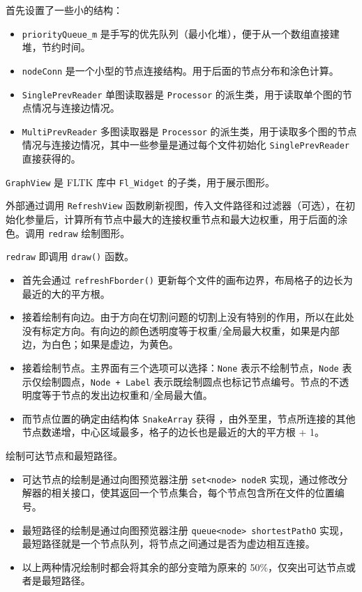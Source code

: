 \documentclass[a4paper,12pt]{article}
\begin{document}
\begin{CJK}{UTF8}{song}
首先设置了一些小的结构：

\begin{itemize}
\item
  \texttt{priorityQueue\_m}
  是手写的优先队列（最小化堆），便于从一个数组直接建堆，节约时间。
\item
  \texttt{nodeConn}
  是一个小型的节点连接结构。用于后面的节点分布和涂色计算。
\item
  \texttt{SinglePrevReader} 单图读取器是 \texttt{Processor}
  的派生类，用于读取单个图的节点情况与连接边情况。
\item
  \texttt{MultiPrevReader} 多图读取器是 \texttt{Processor}
  的派生类，用于读取多个图的节点情况与连接边情况，其中一些参量是通过每个文件初始化
  \texttt{SinglePrevReader} 直接获得的。
\end{itemize}

\texttt{GraphView} 是 FLTK 库中 \texttt{Fl\_Widget}
的子类，用于展示图形。

外部通过调用 \texttt{RefreshView}
函数刷新视图，传入文件路径和过滤器（可选），在初始化参量后，计算所有节点中最大的连接权重节点和最大边权重，用于后面的涂色。调用
\texttt{redraw} 绘制图形。

\texttt{redraw} 即调用 \texttt{draw()} 函数。

\begin{itemize}
\item
  首先会通过 \texttt{refreshFborder()}
  更新每个文件的画布边界，布局格子的边长为最近的大的平方根。
\item
  接着绘制有向边。由于方向在切割问题的切割上没有特别的作用，所以在此处没有标定方向。有向边的颜色透明度等于权重/全局最大权重，如果是内部边，为白色；如果是虚边，为黄色。
\item
  接着绘制节点。主界面有三个选项可以选择：\texttt{None}
  表示不绘制节点，\texttt{Node} 表示仅绘制圆点，\texttt{Node\ +\ Label}
  表示既绘制圆点也标记节点编号。节点的不透明度等于节点的发出边权重和/全局最大值。
\item
  而节点位置的确定由结构体 \texttt{SnakeArray} 获得
  \cite{oj}，由外至里，节点所连接的其他节点数递增，中心区域最多，格子的边长也是最近的大的平方根
  + 1。
\end{itemize}

绘制可达节点和最短路径。

\begin{itemize}
  \item 可达节点的绘制是通过向图预览器注册 \texttt{set<node> nodeR} 实现，通过修改分解器的相关接口，使其返回一个节点集合，每个节点包含所在文件的位置编号。
  \item 最短路径的绘制是通过向图预览器注册 \texttt{queue<node> shortestPathO} 实现，最短路径就是一个节点队列，将节点之间通过是否为虚边相互连接。
  \item 以上两种情况绘制时都会将其余的部分变暗为原来的 50\%，仅突出可达节点或者是最短路径。
\end{itemize}



\end{CJK}
\end{document}
